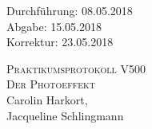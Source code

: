 

\begin{titlepage}
  \begin{flushleft}
 Durchführung: 08.05.2018\\
 Abgabe: 15.05.2018\\
 Korrektur: 23.05.2018
  \end{flushleft}



 \begin{center}


\textsc{\LARGE Praktikumsprotokoll V500}\\[1.5cm]
\textsc{\huge Der Photoeffekt } \\[5,5cm]

Carolin Harkort\footnotemark[1], \\
Jacqueline Schlingmann\footnotemark[2] \\[1,0cm]



 \end{center}

 \vfill

\end{titlepage}


  
  

\nocite{*}
\printbibliography

